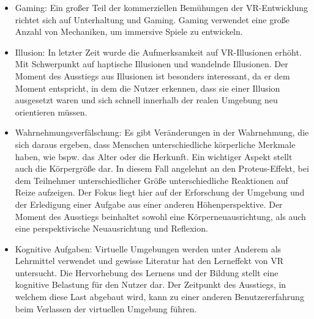 \begin{itemize}
	\item Gaming: Ein großer Teil der kommerziellen Bemühungen der VR-Entwicklung richtet sich auf Unterhaltung und Gaming. Gaming verwendet eine große Anzahl von Mechaniken, um immersive Spiele zu entwickeln.
	\item Illusion: In letzter Zeit wurde die Aufmerksamkeit auf VR-Illusionen erhöht. Mit Schwerpunkt auf haptische Illusionen und wandelnde Illusionen. Der Moment des Ausstiegs aus Illusionen ist besonders interessant, da er dem Moment entspricht, in dem die Nutzer erkennen, dass sie einer Illusion ausgesetzt waren und sich schnell innerhalb der realen Umgebung neu orientieren müssen.
	\item Wahrnehmungsverfälschung: Es gibt Veränderungen in der Wahrnehmung, die sich daraus ergeben, dass Menschen unterschiedliche körperliche Merkmale haben, wie bspw. das Alter oder die Herkunft. Ein wichtiger Aspekt stellt auch die Körpergröße dar. In diesem Fall angelehnt an den Proteus-Effekt, bei dem Teilnehmer unterschiedlicher Größe unterschiedliche Reaktionen auf Reize aufzeigen. Der Fokus liegt hier auf der Erforschung der Umgebung und der Erledigung einer Aufgabe aus einer anderen Höhenperspektive. Der Moment des Ausstiegs beinhaltet sowohl eine Körperneuausrichtung, als auch eine perspektivische Neuausrichtung und Reflexion.
	\item Kognitive Aufgaben: Virtuelle Umgebungen werden unter Anderem als Lehrmittel verwendet und gewisse Literatur hat den Lerneffekt von VR untersucht. Die Hervorhebung des Lernens und der Bildung stellt eine kognitive Belastung für den Nutzer dar. Der Zeitpunkt des Ausstiegs, in welchem diese Last abgebaut wird, kann zu einer anderen Benutzererfahrung beim Verlassen der virtuellen Umgebung führen.
\end{itemize}

